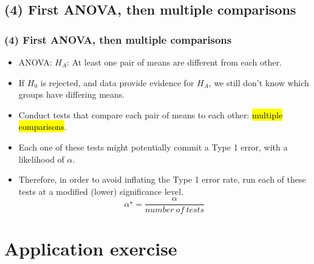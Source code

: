 \documentclass[11pt,containsverbatim,handout]{beamer}
\begin{document}

\subsection{(4) First ANOVA, then multiple comparisons}


\begin{frame}
\frametitle{(4) First ANOVA, then multiple comparisons}

\begin{itemize}

\item ANOVA: $H_A$:  At least one pair of means are different from each other.

\pause

\item If $H_0$ is rejected, and data provide evidence for $H_A$, we still don't know which groups have differing means.

\pause

\item Conduct tests that compare each pair of means to each other: \hl{multiple comparisons}.

\pause

\item Each one of these tests might potentially commit a Type 1 error, with a likelihood of $\alpha$.

\pause

\item Therefore, in order to avoid inflating the Type 1 error rate, run each of these tests at a modified (lower) significance level. 
\[ \alpha^\star = \frac{\alpha}{number~of~tests} \]

\end{itemize}

\end{frame}


\begin{frame}
\frametitle{}


\end{frame}


\section{Application exercise}
\end{document}
